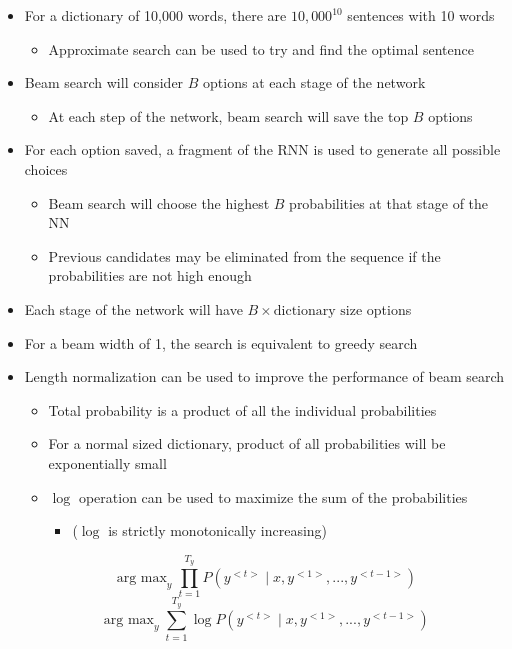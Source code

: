 \documentclass[12pt, letterpaper]{article}
\begin{document}
\begin{itemize}
        \item For a dictionary of 10,000 words, there are $10,000^{10}$ sentences with 10 words
        \begin{itemize}
            \item Approximate search can be used to try and find the optimal sentence
        \end{itemize}
        \item Beam search will consider $B$ options at each stage of the network
        \begin{itemize}
            \item At each step of the network, beam search will save the top $B$ options
        \end{itemize}
        \item For each option saved, a fragment of the RNN is used to generate all possible choices
        \begin{itemize}
            \item Beam search will choose the highest $B$ probabilities at that stage of the NN
            \item Previous candidates may be eliminated from the sequence if the probabilities are not high enough
        \end{itemize}
        \item Each stage of the network will have $B\times\text{dictionary size}$ options
        \item For a beam width of 1, the search is equivalent to greedy search
        \item Length normalization can be used to improve the performance of beam search
        \begin{itemize}
            \item Total probability is a product of all the individual probabilities
            \item For a normal sized dictionary, product of all probabilities will be exponentially small
            \item $\log$ operation can be used to maximize the sum of the probabilities
            \begin{itemize}
                \item[] ($\log$ is strictly monotonically increasing)
            \end{itemize}
        \end{itemize}
        $$\mathop{\text{arg max}}_{y}\prod_{t=1}^{T_y}P(y^{<t>}\mid x,y^{<1>},...,y^{<t-1>})$$
        $$\mathop{\text{arg max}}_{y}\sum_{t=1}^{T_y}\log P(y^{<t>}\mid x,y^{<1>},...,y^{<t-1>})$$

\end{itemize}
\end{document}
